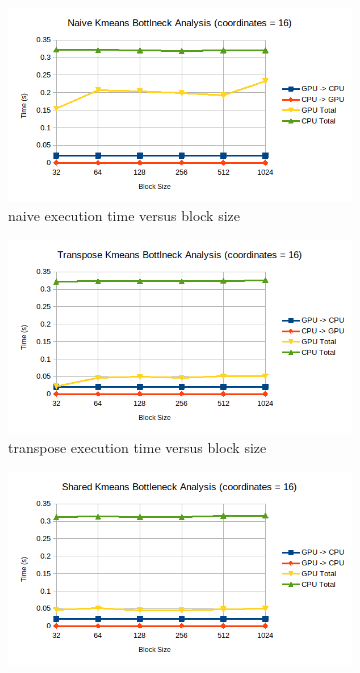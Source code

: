 \documentclass{article}
\newcommand{\eng}[1]{#1}
\begin{document}
\begin{figure}[h]
    \centering
    \begin{subfigure}{0.65\textwidth}
        \includegraphics[width=\textwidth]{../a4/plots/PBS_naive_kmeans_bottleneck_16.png}
        \caption{\eng{naive} execution time versus \eng{block size}}
        \label{fig:naive_pbs16}
    \end{subfigure}
    \begin{subfigure}{0.65\textwidth}
        \includegraphics[width=\textwidth]{../a4/plots/PBS_transpose_kmeans_bottleneck_16.png}
        \caption{\eng{transpose} execution time versus \eng{block size}}
        \label{fig:transpose_pbs16}
    \end{subfigure}
    \vspace{1em}
    \begin{subfigure}{0.65\textwidth}
        \includegraphics[width=\textwidth]{../a4/plots/PBS_shared_kmeans_bottleneck_16.png}

\end{subfigure}
\end{figure}
\end{document}
